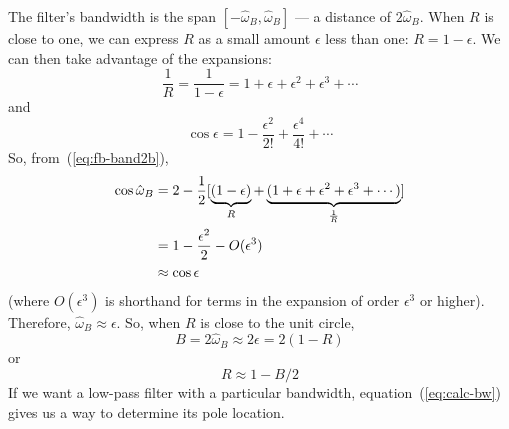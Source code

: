 The filter's bandwidth is the span $[-\hat{\omega}_B, \hat{\omega}_B]$
--- a distance of $2\hat{\omega}_B$.  When $R$ is close to one, we can
express $R$ as a small amount $\epsilon$ less than one:
$R=1-\epsilon$. We can then take advantage of the expansions:
\begin{equation}
\frac{1}{R}=\frac{1}{1-\epsilon}=1+\epsilon+\epsilon^2+\epsilon^3+\cdots
\end{equation}
and
\begin{equation}
\cos\epsilon=1-\frac{\epsilon^2}{2!}+\frac{\epsilon^4}{4!}+\cdots
\end{equation}
So, from~(\ref{eq:fb-band2b}),
\begin{align}
\cos\hat{\omega}_B &= 2-\frac{1}{2}[\underbrace{(1-\epsilon)}_{R} +
            \underbrace{(1+\epsilon+\epsilon^2+\epsilon^3+\cdots)}_{\frac{1}{R}}]
              \notag\\
   &= 1-\frac{\epsilon^2}{2}-O(\epsilon^3) \notag\\
   &\approx \cos\epsilon
\end{align} 
(where $O(\epsilon^3)$ is shorthand for terms in the expansion of
order $\epsilon^3$ or higher).  Therefore,
$\hat{\omega}_B\approx\epsilon$.  So, when $R$ is close to the unit
circle,
\begin{equation}
B = 2\hat{\omega}_B \approx 2\epsilon =2(1-R)
\end{equation}
or 
\begin{equation}
R \approx 1-B/2
\label{eq:calc-bw}
\end{equation}
If we want a low-pass filter with a particular bandwidth,
equation~(\ref{eq:calc-bw}) gives us a way to determine its pole
location.



